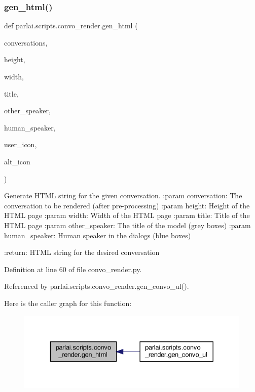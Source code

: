 \subsubsection{\texorpdfstring{gen\+\_\+html()}{gen\_html()}}
{\footnotesize\ttfamily def parlai.\+scripts.\+convo\+\_\+render.\+gen\+\_\+html (\begin{DoxyParamCaption}\item[{}]{conversations,  }\item[{}]{height,  }\item[{}]{width,  }\item[{}]{title,  }\item[{}]{other\+\_\+speaker,  }\item[{}]{human\+\_\+speaker,  }\item[{}]{user\+\_\+icon,  }\item[{}]{alt\+\_\+icon }\end{DoxyParamCaption})}

\begin{DoxyVerb}Generate HTML string for the given conversation.
:param conversation:
    The conversation to be rendered (after pre-processing)
:param height:
    Height of the HTML page
:param width:
    Width of the HTML page
:param title:
    Title of the HTML page
:param other_speaker:
    The title of the model (grey boxes)
:param human_speaker:
    Human speaker in the dialogs (blue boxes)

:return: HTML string for the desired conversation
\end{DoxyVerb}
 

Definition at line 60 of file convo\+\_\+render.\+py.



Referenced by parlai.\+scripts.\+convo\+\_\+render.\+gen\+\_\+convo\+\_\+ul().

Here is the caller graph for this function\+:
\nopagebreak
\begin{figure}[H]
\begin{center}
\leavevmode
\includegraphics[width=329pt]{namespaceparlai_1_1scripts_1_1convo__render_ad23695f4d64e7dbd1fee801098d570b2_icgraph}
\end{center}
\end{figure}
\mbox{\label{namespaceparlai_1_1scripts_1_1convo__render_a21a7681b9803eb6994ac72c7d480cb94}} 
